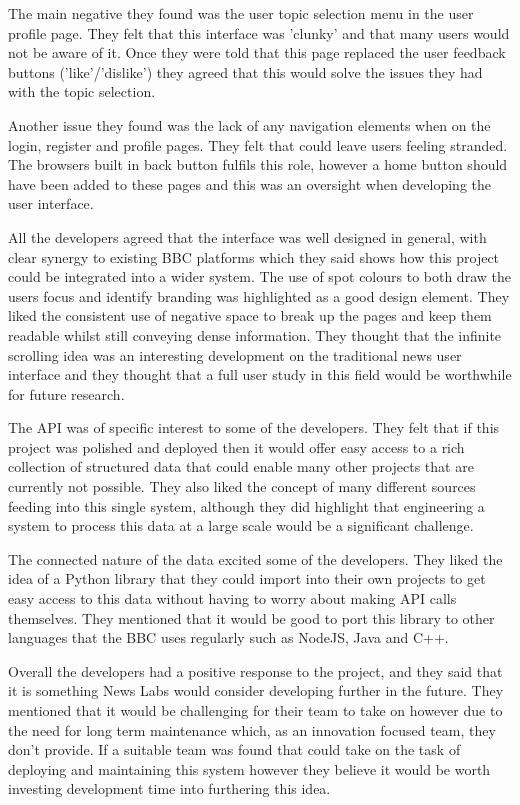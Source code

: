 \documentclass[12pt,titlepage]{article}
\begin{document}
  The main negative they found was the user topic selection menu in the user
  profile page. They felt that this interface was 'clunky' and that many users
  would not be aware of it. Once they were told that this page replaced the user
  feedback buttons ('like'/'dislike') they agreed that this would solve the
  issues they had with the topic selection.

  Another issue they found was the lack of any navigation elements when on the
  login, register and profile pages. They felt that could leave users feeling
  stranded. The browsers built in back button fulfils this role, however a home
  button should have been added to these pages and this was an oversight when
  developing the user interface.

  All the developers agreed that the interface was well designed in general,
  with clear synergy to existing BBC platforms which they said shows how this
  project could be integrated into a wider system. The use of spot colours to
  both draw the users focus and identify branding was highlighted as a good
  design element. They liked the consistent use of negative space to break up
  the pages and keep them readable whilst still conveying dense information.
  They thought that the infinite scrolling idea was an interesting development
  on the traditional news user interface and they thought that a full user study
  in this field would be worthwhile for future research.

  The API was of specific interest to some of the developers. They felt that if
  this project was polished and deployed then it would offer easy access to a
  rich collection of structured data that could enable many other projects that
  are currently not possible. They also liked the concept of many different
  sources feeding into this single system, although they did highlight that
  engineering a system to process this data at a large scale would be a
  significant challenge.

  The connected nature of the data excited some of the developers. They liked
  the idea of a Python library that they could import into their own projects to
  get easy access to this data without having to worry about making API calls
  themselves. They mentioned that it would be good to port this library to other
  languages that the BBC uses regularly such as NodeJS, Java and C++.

  Overall the developers had a positive response to the project, and they said
  that it is something News Labs would consider developing further in the
  future. They mentioned that it would be challenging for their team to take on
  however due to the need for long term maintenance which, as an innovation
  focused team, they don't provide. If a suitable team was found that could take
  on the task of deploying and maintaining this system however they believe it
  would be worth investing development time into furthering this idea.
\end{document}
